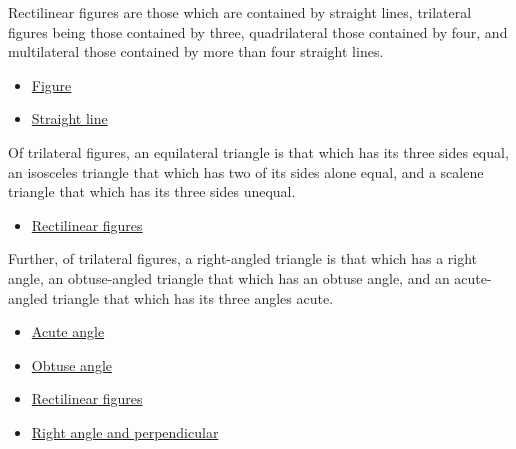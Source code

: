 \begin{definition}
\label{def-euclid-rectilinear-figures}
Rectilinear figures are those which are contained by straight lines, trilateral
figures being those contained by three, quadrilateral those contained by four,
and multilateral those contained by more than four straight lines.
\end{definition}
\begin{lra-not-visible}
\begin{dependencies}
\begin{itemize}
  \item \hyperref[def-euclid-figure]{Figure}
  \item \hyperref[def-euclid-straight-line]{Straight line}
\end{itemize}
\end{dependencies}
\end{lra-not-visible}

\begin{definition}
\label{def-euclid-triangle-side-classes}
Of trilateral figures, an equilateral triangle is that which has its three
sides equal, an isosceles triangle that which has two of its sides alone equal,
and a scalene triangle that which has its three sides unequal.
\end{definition}
\begin{lra-not-visible}
\begin{dependencies}
\begin{itemize}
  \item \hyperref[def-euclid-rectilinear-figures]{Rectilinear figures}
\end{itemize}
\end{dependencies}
\end{lra-not-visible}

\begin{definition}
\label{def-euclid-triangle-angle-classes}
Further, of trilateral figures, a right-angled triangle is that which has a
right angle, an obtuse-angled triangle that which has an obtuse angle, and an
acute-angled triangle that which has its three angles acute.
\end{definition}
\begin{lra-not-visible}
\begin{dependencies}
\begin{itemize}
  \item \hyperref[def-euclid-acute-angle]{Acute angle}
  \item \hyperref[def-euclid-obtuse-angle]{Obtuse angle}
  \item \hyperref[def-euclid-rectilinear-figures]{Rectilinear figures}
  \item \hyperref[def-euclid-right-angle-and-perpendicular]{Right angle and perpendicular}
\end{itemize}
\end{dependencies}
\end{lra-not-visible}

